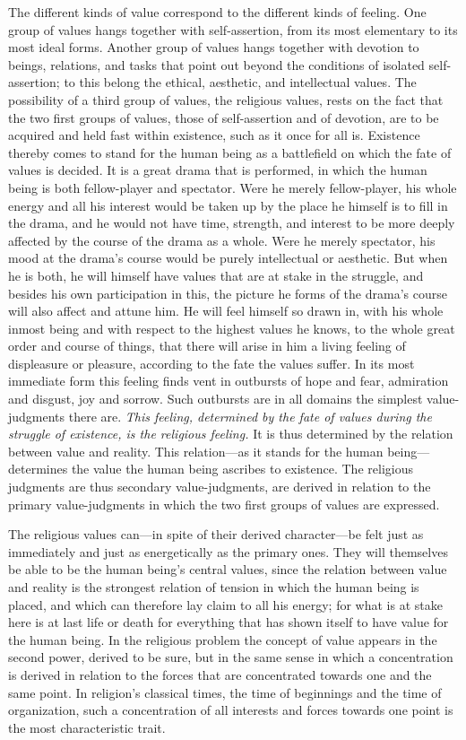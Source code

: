 \documentclass[12pt,a4paper]{book}
\newcommand{\opage}[1]{\marginnote{\footnotesize\textit{[#1]}}}
\begin{document}
The different kinds of value correspond to the different kinds of feeling. One
group of values hangs together with self-assertion, from its most elementary to
its most ideal forms. Another group of values hangs together with devotion to
beings, relations, and tasks that point out beyond the conditions of isolated
self-assertion; to this belong the ethical, aesthetic, and intellectual values.
The possibility of a third group of values, the religious values, rests on the
fact that the two first groups of values, those of self-assertion and of
devotion, are to be acquired and held fast within existence, such as it once
for all is. Existence thereby comes to stand for the human being as a
battlefield on which the fate of values is decided. It is a great drama that is
performed, in which the human being is both fellow-player and spectator. Were
he merely fellow-player, his whole energy and all his interest would be taken
up by the place he himself is to fill in the drama, and he would not have time,
strength, and interest to be more deeply affected by the course of the drama as
a whole. Were he merely spectator, his mood at the drama's course would be
purely intellectual or aesthetic. But when 
\opage{63}he is both, he will himself have
values that are at stake in the struggle, and besides his own participation in
this, the picture he forms of the drama's course will also affect and attune
him. He will feel himself so drawn in, with his whole inmost being and with
respect to the highest values he knows, to the whole great order and course of
things, that there will arise in him a living feeling of displeasure or
pleasure, according to the fate the values suffer. In its most immediate form
this feeling finds vent in outbursts of hope and fear, admiration and disgust,
joy and sorrow. Such outbursts are in all domains the simplest value-judgments
there are. \emph{This feeling, determined by the fate of values during the
struggle of existence, is the religious feeling.} It is thus determined by the
relation between value and reality. This relation---as it stands for the human
being---determines the value the human being ascribes to existence. The
religious judgments are thus secondary value-judgments, are derived in relation
to the primary value-judgments in which the two first groups of values are
expressed.

The religious values can---in spite of their derived character---be felt just
as immediately and just as energetically as the primary ones. They will
themselves be able to be the human being's central values, since the relation
between value and reality is the strongest relation of tension in which the
human being is placed, and which can therefore lay claim to all his energy; for
what is at stake here is at last life or death for everything that has shown
itself to have value for the human being. In the religious problem the concept
of value appears in the second power, derived to be sure, but in the same sense
in which a concentration is derived in relation to the forces that are
concentrated towards one and the same point. In religion's classical times, the
time of beginnings and the time of organization, such a concentration of all
interests and forces towards one point is the most characteristic trait.
\end{document}
